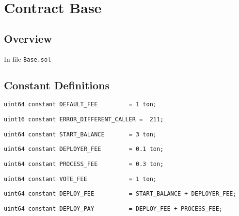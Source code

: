 
\chapter{Contract Base}

\minitoc

\section{Overview}


In file {\tt Base.sol}

\section{Constant Definitions}


\begin{lstlisting}[firstnumber=8]
    uint64 constant DEFAULT_FEE         = 1 ton;
\end{lstlisting}

\begin{lstlisting}[firstnumber=10]
    uint16 constant ERROR_DIFFERENT_CALLER =  211;
\end{lstlisting}

\begin{lstlisting}[firstnumber=12]
    uint64 constant START_BALANCE       = 3 ton;
\end{lstlisting}

\begin{lstlisting}[firstnumber=13]
    uint64 constant DEPLOYER_FEE        = 0.1 ton;
\end{lstlisting}

\begin{lstlisting}[firstnumber=14]
    uint64 constant PROCESS_FEE         = 0.3 ton;
\end{lstlisting}

\begin{lstlisting}[firstnumber=15]
    uint64 constant VOTE_FEE            = 1 ton;
\end{lstlisting}

\begin{lstlisting}[firstnumber=16]
    uint64 constant DEPLOY_FEE          = START_BALANCE + DEPLOYER_FEE;
\end{lstlisting}

\begin{lstlisting}[firstnumber=17]
    uint64 constant DEPLOY_PAY          = DEPLOY_FEE + PROCESS_FEE;
\end{lstlisting}

